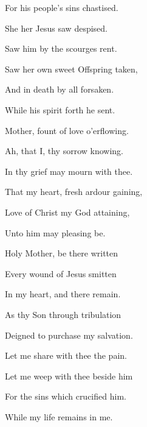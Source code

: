 \begin{multicols}{2}
\begin{hangparas}{1.25em}{1}
For his people's sins chastised.

She her Jesus saw despised.

Saw him by the scourges rent.%

\vspace{0.75\baselineskip}

Saw her own sweet Offspring taken,

And in death by all forsaken.

While his spirit forth he sent.%

\vspace{0.75\baselineskip}

Mother, fount of love o'erflowing.

Ah, that I, thy sorrow knowing.

In thy grief may mourn with thee.%

\vspace{0.75\baselineskip}

That my heart, fresh ardour gaining,

Love of Christ my God attaining,

Unto him may pleasing be.%

\vspace{0.75\baselineskip}

Holy Mother, be there written

Every wound of Jesus smitten

In my heart, and there remain.%

\vspace{0.75\baselineskip}

As thy Son through tribulation

Deigned to purchase my salvation.

Let me share with thee the pain.%

\vspace{0.75\baselineskip}

Let me weep with thee beside him

For the sins which crucified him.

While my life remains in me.%


\end{hangparas}
\end{multicols}
